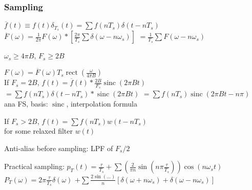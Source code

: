 \documentclass[4pt]{article}
\theoremstyle{definition}
\theoremstyle{definition}
\renewcommand{\o}{\omega}
\DeclareMathOperator{\rect}{rect}
\DeclareMathOperator{\sinc}{sinc}
\begin{document}
\begin{multicols}{3}
\subsubsection {Sampling}
    \(\overline{f}(t)\equiv f(t) \delta_{T_s}(t) = \sum f(nT_s) \delta(t - nT_s)\)\\
    \(\overline{F}(\o) = \frac{1}{2\pi} F(\o) * [\frac{2\pi}{T_s} \sum\delta(\o - n\o_s)]\)
    \(= \frac{1}{T_s}\sum F(\o - n\o_s)\)

    $\o_s \geq 4\pi B$, $F_s \geq 2B$

    \(F(\o) = \overline{F}(\o) T_s \rect(\frac{\o}{4\pi B})\)\\   %
    If $F_s = 2B$, \(f(t) = \overline{f}(t) * \frac{2B}{F_s} \sinc(2\pi Bt)\)\\       %
    \(=\sum f(nT_s)\delta(t - nT_s) * \sinc(2\pi B t)\)
    \(= \sum f(nT_s) \sinc(2\pi Bt - n\pi)\)\\
    ana FS, basis: $\sinc$, interpolation formula

    If $F_s > 2B$, \(f(t) = \sum f(nT_s) w(t - nT_s)\)\\
    for some relaxed filter $w(t)$

    Anti-alias before sampling: LPF of $F_s/2$

    Practical sampling: \(p_T(t) = \frac{\tau}{T_s} + \sum(\frac{2}{\pi n}\sin(n\pi\frac{\tau}{T_s}))\cos(n\omega_s t)\)\\
    \(P_T(\o) = 2\pi \frac{\tau}{T_s}\delta(\o)\)
    \(+ \sum\frac{2\sin(...)}{n}[\delta(\o + n\o_s) + \delta(\o - n\o_s)]\)       %
\end{multicols}  
\end{document}
